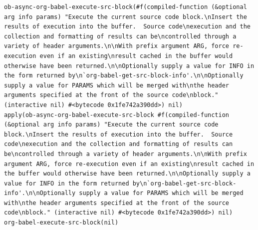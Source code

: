 \documentclass[11pt]{article}
\begin{document}
\begin{enumerate}
\begin{verbatim}
ob-async-org-babel-execute-src-block(#f(compiled-function (&optional arg info params) "Execute the current source code block.\nInsert the results of execution into the buffer.  Source code\nexecution and the collection and formatting of results can be\ncontrolled through a variety of header arguments.\n\nWith prefix argument ARG, force re-execution even if an existing\nresult cached in the buffer would otherwise have been returned.\n\nOptionally supply a value for INFO in the form returned by\n`org-babel-get-src-block-info'.\n\nOptionally supply a value for PARAMS which will be merged with\nthe header arguments specified at the front of the source code\nblock." (interactive nil) #<bytecode 0x1fe742a390dd>) nil)
apply(ob-async-org-babel-execute-src-block #f(compiled-function (&optional arg info params) "Execute the current source code block.\nInsert the results of execution into the buffer.  Source code\nexecution and the collection and formatting of results can be\ncontrolled through a variety of header arguments.\n\nWith prefix argument ARG, force re-execution even if an existing\nresult cached in the buffer would otherwise have been returned.\n\nOptionally supply a value for INFO in the form returned by\n`org-babel-get-src-block-info'.\n\nOptionally supply a value for PARAMS which will be merged with\nthe header arguments specified at the front of the source code\nblock." (interactive nil) #<bytecode 0x1fe742a390dd>) nil)
org-babel-execute-src-block(nil)

\end{verbatim}
\end{enumerate}
\end{document}
